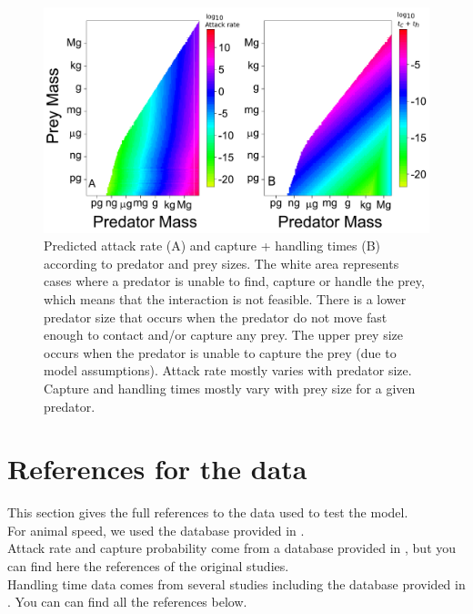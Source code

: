 \documentclass[utf8, 12 pt]{frontiers_suppmat}
\begin{document}
\clearpage
\begin{figure}[ht]
\begin{center}
\doublespacing
\includegraphics[width = 18 cm, keepaspectratio]{Attack_Rate_Map2}
\caption{Predicted attack rate (A) and capture + handling times (B) according to predator and prey sizes. The white area represents cases where a predator is unable to find, capture or handle the prey, which means that the interaction is not feasible. There is a lower predator size that occurs when the predator do not move fast enough to contact and/or capture any prey. The upper prey size occurs when the predator is unable to capture the prey (due to model assumptions). Attack rate mostly varies with predator size. Capture and handling times mostly vary with prey size for a given predator.}
\end{center}
\end{figure}

\clearpage
\section{References for the data}
This section gives the full references to the data used to test the model.\\
For animal speed, we used the database provided in \cite{Hirt2017}. \\
Attack rate and capture probability come from a database provided in \cite{Li2018}, but you can find here the references of the original studies. \\
Handling time data comes from several studies including the database provided in \cite{Li2018}. You can can find all the references below.
\nocite{ Yocom1974, Persson1986, Bergman1987, Fuiman1991, Fuiman1994, Taylor2003, DeBlois1991, Anderson1978, Bailey1989, Barnhisel2004, Bergstrom2004, Buckel2000, Butler1993, Colton1987, Cothran1985, Fox1978, Galarowicz2005, Gresens1982, Houde1980, Koski2002, Ljunggren2007, Mckee1997, Miller1992, Moss2007, Spitze1985, Taylor2003, Thompson1975, Thompson1978, Vinyard1980}

\end{document}
